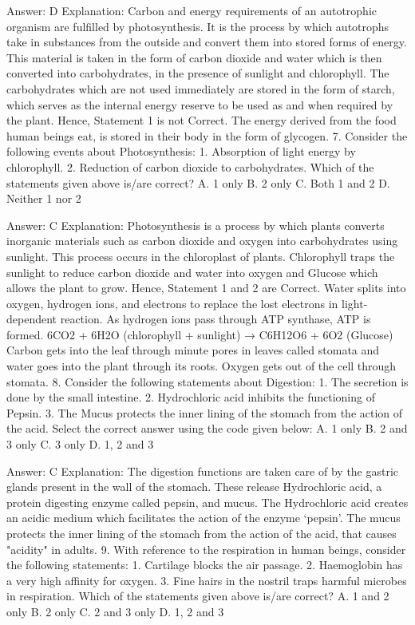 Answer: D
Explanation: Carbon and energy requirements of an autotrophic organism are fulfilled by photosynthesis. It is the process by which autotrophs take in substances from the outside and convert them into stored forms of energy. This material is taken in the form of carbon dioxide and water which is then converted into carbohydrates, in the presence of sunlight and chlorophyll. The carbohydrates which are not used immediately are stored in the form of starch, which serves as the internal energy reserve to be used as and when required by the plant. Hence, Statement 1 is not Correct. The energy derived from the food human beings eat, is stored in their body in the form of glycogen. 7. Consider the following events about Photosynthesis: 1. Absorption of light energy by chlorophyll. 2. Reduction of carbon dioxide to carbohydrates. Which of the statements given above is/are correct? A. 1 only B. 2 only C. Both 1 and 2 D. Neither 1 nor 2 

Answer: C
Explanation: Photosynthesis is a process by which plants converts inorganic materials such as carbon dioxide and oxygen into carbohydrates using sunlight. This process occurs in the chloroplast of plants. Chlorophyll traps the sunlight to reduce carbon dioxide and water into oxygen and Glucose which allows the plant to grow. Hence, Statement 1 and 2 are Correct. Water splits into oxygen, hydrogen ions, and electrons to replace the lost electrons in light-dependent reaction. As hydrogen ions pass through ATP synthase, ATP is formed. 6CO2 + 6H2O (chlorophyll + sunlight) → C6H12O6 + 6O2 (Glucose) Carbon gets into the leaf through minute pores in leaves called stomata and water goes into the plant through its roots. Oxygen gets out of the cell through stomata. 8. Consider the following statements about Digestion: 1. The secretion is done by the small intestine. 2. Hydrochloric acid inhibits the functioning of Pepsin. 3. The Mucus protects the inner lining of the stomach from the action of the acid. Select the correct answer using the code given below: A. 1 only B. 2 and 3 only C. 3 only D. 1, 2 and 3 

Answer: C
Explanation: The digestion functions are taken care of by the gastric glands present in the wall of the stomach. These release Hydrochloric acid, a protein digesting enzyme called pepsin, and mucus. The Hydrochloric acid creates an acidic medium which facilitates the action of the enzyme ‘pepsin’. The mucus protects the inner lining of the stomach from the action of the acid, that causes "acidity" in adults. 9. With reference to the respiration in human beings, consider the following statements: 1. Cartilage blocks the air passage. 2. Haemoglobin has a very high affinity for oxygen. 3. Fine hairs in the nostril traps harmful microbes in respiration. Which of the statements given above is/are correct? A. 1 and 2 only B. 2 only C. 2 and 3 only D. 1, 2 and 3 

